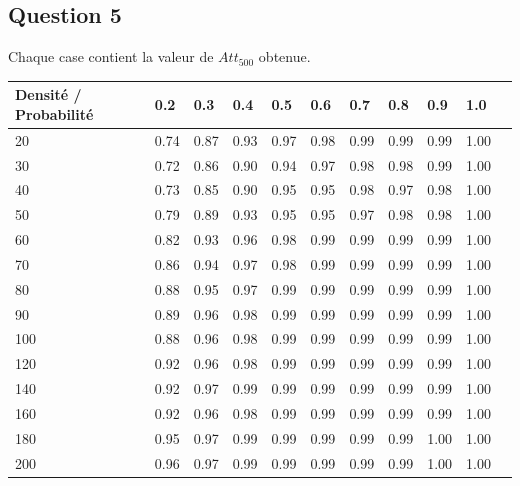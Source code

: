 \documentclass[10pt]{report}
\begin{document}
\subsection{Question 5}
Chaque case contient la valeur de $Att_{500}$ obtenue.\newline
\begin{center}
\captionsetup{type=figure}
\begin{tabular}{|l|l|l|l|l|l|l|l|l|l|l|} \hline
  	Densité / Probabilité & 0.2 & 0.3 & 0.4 & 0.5 & 0.6 & 0.7 & 0.8 & 0.9 & 1.0\\ \hline
	20 & 0.74 & 0.87 & 0.93 & 0.97 & 0.98 & 0.99 & 0.99 & 0.99 & 1.00 \\ \hline
  	30 & 0.72 & 0.86 & 0.90 & 0.94 & 0.97 & 0.98 & 0.98 & 0.99 & 1.00 \\ \hline
  	40 & 0.73 & 0.85 & 0.90 & 0.95 & 0.95 & 0.98 & 0.97 & 0.98 & 1.00 \\ \hline
  	50 & 0.79 & 0.89 & 0.93 & 0.95 & 0.95 & 0.97 & 0.98 & 0.98 & 1.00 \\ \hline
  	60 & 0.82 & 0.93 & 0.96 & 0.98 & 0.99 & 0.99 & 0.99 & 0.99 & 1.00 \\ \hline
  	70 & 0.86 & 0.94 & 0.97 & 0.98 & 0.99 & 0.99 & 0.99 & 0.99 & 1.00 \\ \hline
    80 & 0.88 & 0.95 & 0.97 & 0.99 & 0.99 & 0.99 & 0.99 & 0.99 & 1.00 \\ \hline
  	90 & 0.89 & 0.96 & 0.98 & 0.99 & 0.99 & 0.99 & 0.99 & 0.99 & 1.00 \\ \hline
  	100 & 0.88 & 0.96 & 0.98 & 0.99 & 0.99 & 0.99 & 0.99 & 0.99 & 1.00 \\ \hline
  	120 & 0.92 & 0.96 & 0.98 & 0.99 & 0.99 & 0.99 & 0.99 & 0.99 & 1.00 \\ \hline
  	140 & 0.92 & 0.97 & 0.99 & 0.99 & 0.99 & 0.99 & 0.99 & 0.99 & 1.00 \\ \hline
  	160 & 0.92 & 0.96 & 0.98 & 0.99 & 0.99 & 0.99 & 0.99 & 0.99 & 1.00 \\ \hline
  	180 & 0.95 & 0.97 & 0.99 & 0.99 & 0.99 & 0.99 & 0.99 & 1.00 & 1.00 \\ \hline
  	200 & 0.96 & 0.97 & 0.99 & 0.99 & 0.99 & 0.99 & 0.99 & 1.00 & 1.00 \\ \hline
\end{tabular}
\end{center}
\end{document}
